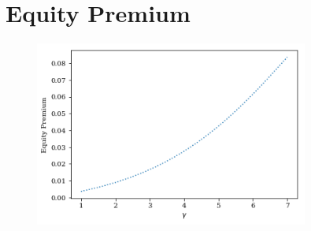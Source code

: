 \documentclass{article}
\begin{document}
\section{Equity Premium}
\begin{figure}[h]
	\centering
	\includegraphics[width=9cm]{output_7_0.png}
\end{figure}
\end{document}
